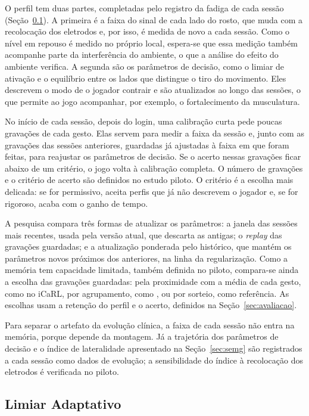 \documentclass[runningheads]{llncs}
\begin{document}
O perfil tem duas partes, completadas pelo registro da fadiga de cada sessão (Seção~\ref{sec:limiar}). A primeira é a faixa do sinal de cada lado do rosto, que muda com a recolocação dos eletrodos e, por isso, é medida de novo a cada sessão. Como o nível em repouso é medido no próprio local, espera-se que essa medição também acompanhe parte da interferência do ambiente, o que a análise do efeito do ambiente verifica. A segunda são os parâmetros de decisão, como o limiar de ativação e o equilíbrio entre os lados que distingue o tiro do movimento. Eles descrevem o modo de o jogador contrair e são atualizados ao longo das sessões, o que permite ao jogo acompanhar, por exemplo, o fortalecimento da musculatura.

No início de cada sessão, depois do login, uma calibração curta pede poucas gravações de cada gesto. Elas servem para medir a faixa da sessão e, junto com as gravações das sessões anteriores, guardadas já ajustadas à faixa em que foram feitas, para reajustar os parâmetros de decisão. Se o acerto nessas gravações ficar abaixo de um critério, o jogo volta à calibração completa. O número de gravações e o critério de acerto são definidos no estudo piloto. O critério é a escolha mais delicada: se for permissivo, aceita perfis que já não descrevem o jogador e, se for rigoroso, acaba com o ganho de tempo.

A pesquisa compara três formas de atualizar os parâmetros: a janela das sessões mais recentes, usada pela versão atual, que descarta as antigas; o \textit{replay} das gravações guardadas; e a atualização ponderada pelo histórico, que mantém os parâmetros novos próximos dos anteriores, na linha da regularização. Como a memória tem capacidade limitada, também definida no piloto, compara-se ainda a escolha das gravações guardadas: pela proximidade com a média de cada gesto, como no iCaRL, por agrupamento, como \citet{zhang2024replay}, ou por sorteio, como referência. As escolhas usam a retenção do perfil e o acerto, definidos na Seção~\ref{sec:avaliacao}.

Para separar o artefato da evolução clínica, a faixa de cada sessão não entra na memória, porque depende da montagem. Já a trajetória dos parâmetros de decisão e o índice de lateralidade apresentado na Seção~\ref{sec:semg} são registrados a cada sessão como dados de evolução; a sensibilidade do índice à recolocação dos eletrodos é verificada no piloto.

\subsection{Limiar Adaptativo}\label{sec:limiar}
\end{document}
